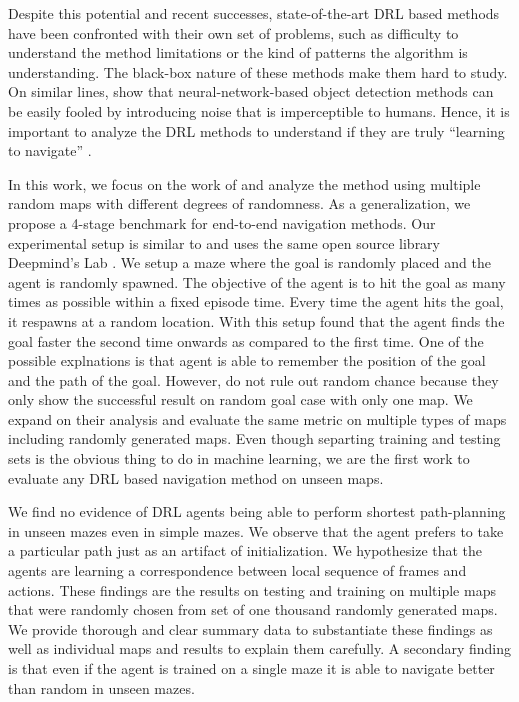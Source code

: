 

Despite this potential and recent successes, 
state-of-the-art DRL based methods have been confronted with their own set of problems, such as difficulty to understand the method limitations or the kind of patterns the algorithm is understanding.  The black-box nature of these methods make them hard to study.
On similar lines, \cite{NgYoClCVPR2015} show that neural-network-based object detection methods can be easily fooled by introducing noise that is imperceptible to humans. Hence, it is important to analyze the DRL methods to understand if they are truly ``learning to navigate'' \cite{MiPaViICLR2017}.


In this work, we focus on the work of \cite{MiPaViICLR2017} and analyze the method using multiple random maps with different degrees of randomness. As a generalization, we propose a 4-stage benchmark for end-to-end navigation methods.
Our experimental setup is similar to \cite{MiPaViICLR2017} and uses the same open source library Deepmind's Lab \cite{BeLeTeARXIV2016}.
We setup a maze where the goal is randomly placed and the agent is randomly spawned.
The objective of the agent is to hit the goal as many times as possible within a fixed episode time.
Every time the agent hits the goal, it respawns at a random location.
With this setup \cite{MiPaViICLR2017} found that the agent finds the goal faster the second time onwards as compared to the first time.
One of the possible explnations is that agent is able to remember the position of the goal and the path of the goal.
However, \cite{MiPaViICLR2017} do not rule out random chance because they only show the successful result on random goal case with only one map.
We expand on their analysis and evaluate the same metric on multiple types of maps including randomly generated maps.
Even though separting training and testing sets is the obvious thing to do in machine learning, we are the first work to evaluate any DRL based navigation method on unseen maps.

We find no evidence of DRL agents being able to perform shortest path-planning in unseen mazes even in simple mazes.
We observe that the agent prefers to take a particular path just as an artifact of initialization.
We hypothesize that the agents are learning a correspondence between local sequence of frames and actions.
These findings are the results on testing and training on multiple maps that were randomly chosen from set of one thousand randomly generated maps.
We provide thorough and clear summary data to substantiate these findings as well as individual maps and results to explain them carefully.
A secondary finding is that even if the agent is trained on a single maze it is able to navigate better than random in unseen mazes.

